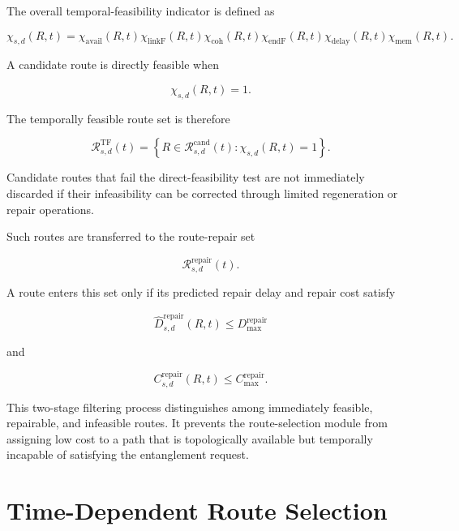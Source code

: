 The overall temporal-feasibility indicator is defined as

\begin{equation}
    \chi_{s,d}(R,t)
    =
    \chi_{\mathrm{avail}}(R,t)
    \chi_{\mathrm{linkF}}(R,t)
    \chi_{\mathrm{coh}}(R,t)
    \chi_{\mathrm{endF}}(R,t)
    \chi_{\mathrm{delay}}(R,t)
    \chi_{\mathrm{mem}}(R,t).
\end{equation}

A candidate route is directly feasible when

\begin{equation}
    \chi_{s,d}(R,t)
    =
    1.
\end{equation}

The temporally feasible route set is therefore

\begin{equation}
    \mathcal{R}_{s,d}^{\mathrm{TF}}(t)
    =
    \left\{
    R
    \in
    \mathcal{R}_{s,d}^{\mathrm{cand}}(t)
    :
    \chi_{s,d}(R,t)
    =
    1
    \right\}.
\end{equation}

Candidate routes that fail the direct-feasibility test are not immediately discarded if their infeasibility can be corrected through limited regeneration or repair operations.

Such routes are transferred to the route-repair set

\begin{equation}
    \mathcal{R}_{s,d}^{\mathrm{repair}}(t).
\end{equation}

A route enters this set only if its predicted repair delay and repair cost satisfy

\begin{equation}
    \widehat{D}_{s,d}^{\mathrm{repair}}(R,t)
    \leq
    D_{\max}^{\mathrm{repair}}
\end{equation}

and

\begin{equation}
    C_{s,d}^{\mathrm{repair}}(R,t)
    \leq
    C_{\max}^{\mathrm{repair}}.
\end{equation}

This two-stage filtering process distinguishes among immediately feasible, repairable, and infeasible routes. It prevents the route-selection module from assigning low cost to a path that is topologically available but temporally incapable of satisfying the entanglement request.
\section{Time-Dependent Route Selection}

